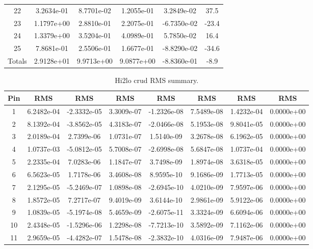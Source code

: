 \begin{table}[h]
\begin{center}
\begin{tabular}[h]{|c|c|c|c|c|c|}
22	 &3.2634e-01 & 8.7701e-02 & 1.2055e-01 & 3.2849e-02 & 37.5\\
23	 &1.1797e+00 & 2.8810e-01 & 2.2075e-01 & -6.7350e-02  & -23.4\\
24	 &1.3379e+00 & 3.5204e-01 & 4.0989e-01 & 5.7850e-02 & 16.4\\
25	 &7.8681e-01 & 2.5506e-01 & 1.6677e-01 & -8.8290e-02  & -34.6\\
\hline \hline
Totals	 & 2.9128e+01 & 9.9713e+00 & 9.0877e+00 & -8.8360e-01  & -8.9\\
\hline
\end{tabular}
\label{tab:loo_crud_cmass}
\end{center}
\end{table}

\begin{table}[h]
    \begin{center}
        \caption[Hi2lo crud RMS summary.]{Hi2lo crud RMS summary.}
    \begin{tabular}[h]{|c|c|c|c|c|c|c|c|}
        \hline
Pin  & RMS & RMS & RMS & RMS & RMS & RMS & RMS \\
\hline
1  & 6.2482e-04 & -2.3332e-05 & 3.3009e-07 & -1.2326e-08 & 7.5489e-08 & 1.4232e-04 & 0.0000e+00 \\
2  & 8.1392e-04 & -3.8562e-05 & 4.3183e-07 & -2.0466e-08 & 5.1953e-08 & 9.8041e-05 & 0.0000e+00 \\
3  & 2.0189e-04 & 2.7399e-06 & 1.0731e-07 & 1.5140e-09 & 3.2678e-08 & 6.1962e-05 & 0.0000e+00 \\
4  & 1.0737e-03 & -5.0812e-05 & 5.7008e-07 & -2.6998e-08 & 5.6847e-08 & 1.0737e-04 & 0.0000e+00 \\
5  & 2.2335e-04 & 7.0283e-06 & 1.1847e-07 & 3.7498e-09 & 1.8974e-08 & 3.6318e-05 & 0.0000e+00 \\
6  & 6.5623e-05 & 1.7178e-06 & 3.4608e-08 & 8.9595e-10 & 9.1686e-09 & 1.7713e-05 & 0.0000e+00 \\
7  & 2.1295e-05 & -5.2469e-07 & 1.0898e-08 & -2.6945e-10 & 4.0210e-09 & 7.9597e-06 & 0.0000e+00 \\
8  & 1.8572e-05 & 7.2717e-07 & 9.4019e-09 & 3.6144e-10 & 2.9861e-09 & 5.9122e-06 & 0.0000e+00 \\
9  & 1.0839e-05 & -5.1974e-08 & 5.4659e-09 & -2.6075e-11 & 3.3324e-09 & 6.6094e-06 & 0.0000e+00 \\
10  & 2.4348e-05 & -1.5296e-06 & 1.2298e-08 & -7.7213e-10 & 3.5892e-09 & 7.1162e-06 & 0.0000e+00 \\
11  & 2.9659e-05 & -4.4282e-07 & 1.5478e-08 & -2.3832e-10 & 4.0316e-09 & 7.9487e-06 & 0.0000e+00 \\

\end{tabular}
\end{center}
\end{table}
